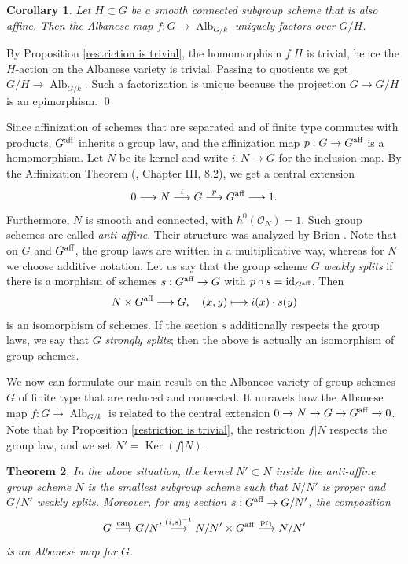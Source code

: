 \documentclass[oneside, 12pt]{amsart}
\newcommand\mylabel[1]{\label{#1}\marginpar{\vspace{-1ex}\medskip\medskip\footnotesize \tt #1}}
\renewcommand\mylabel[1]{\label{#1}}
\newtheorem{theorem}{Theorem}[section]
\newtheorem{corollary}[theorem]{Corollary}
\theoremstyle{definition}
\theoremstyle{remark}
\newcommand{\aff}{\text{\rm aff}}
\newcommand{\Alb}{\operatorname{Alb}}
\newcommand{\can}{\text{\rm  can}}
\newcommand{\id}{{\operatorname{id}}}
\newcommand{\Kernel}{\operatorname{Ker}}
\newcommand{\lra}{\longrightarrow}
\renewcommand{\O}{\mathscr{O}}
\newcommand{\pr}{\operatorname{pr}}
\newcommand{\ra}{\rightarrow}
\begin{document}
\begin{corollary}
\mylabel{albanese map factors}
Let $H\subset G$ be a smooth connected subgroup scheme that is also  affine. Then the Albanese map $f:G\ra \Alb_{G/k}$ uniquely factors over $G/H$.
\end{corollary}

\proof
By Proposition \ref{restriction is trivial}, the homomorphism $f|H$ is  trivial, hence the $H$-action on the Albanese variety is trivial.
Passing to quotients we get  $G/H\ra\Alb_{G/k}$. Such a factorization is unique because the
projection $G\ra G/H$ is an epimorphism.
\qed

\medskip
Since   affinization  of schemes that are separated and of finite type commutes with products,   $G^\aff$
inherits a group law, and the affinization map  $p:G\ra G^\aff$ is a homomorphism.
Let $N$ be its kernel and write $i:N\ra G$ for the inclusion map.
By the  Affinization Theorem (\cite{Demazure; Gabriel 1970}, Chapter III, 8.2),
we get a central extension
\begin{equation}
\label{central extension}
0\lra N\stackrel{i}{\lra} G\stackrel{p}{\lra} G^\aff\lra 1.
\end{equation}
Furthermore, $N$ is smooth and  connected, with $h^0(\O_N)=1$.
Such group schemes are called \emph{anti-affine}. Their structure was analyzed by Brion \cite{Brion 2009}.
Note that on $G$ and $G^\aff$, the group laws are written in a multiplicative way, whereas for $N$ we choose additive notation.
Let us say  that the group scheme $G$ \emph{weakly splits}   if there is a  morphism of schemes $s:G^\aff\ra G$ with
$p\circ s=\id_{G^\aff}$. Then
\begin{equation}
\label{identification weakly split}
N\times G^\aff\lra G,\quad (x,y)\longmapsto i(x)\cdot s(y)
\end{equation}
is an isomorphism of schemes. 
If the section $s$ additionally respects  the group laws, 
we say that $G$ \emph{strongly splits}; then the above is actually an isomorphism of group schemes.

We now can formulate our main result on the Albanese variety of  group schemes $G$ of finite type that are reduced and connected.
It unravels how the Albanese map $f:G\ra\Alb_{G/k}$ is related to the
central extension $0\ra N\ra G\ra G^\aff\ra 0$. Note that by
Proposition \ref{restriction is trivial}, the restriction $f|N$ respects the group law, and we set $N'=\Kernel(f|N)$.

\begin{theorem}
\mylabel{albanese for group schemes}
In the above situation, the kernel $N'\subset N$   inside the anti-affine group scheme
$N$ is the smallest subgroup scheme such that $N/N'$ is proper and   $G/N'$ weakly splits.
Moreover,  for any section $s:G^\aff\ra G/N'$, the composition
$$
G\stackrel{\can}{\lra} G/N'\stackrel{(i,s)^{-1}}{\lra} N/N'\times G^\aff\stackrel{\pr_1}{\lra} N/N'  
$$
is an Albanese map for $G$.
\end{theorem}
\end{document}
